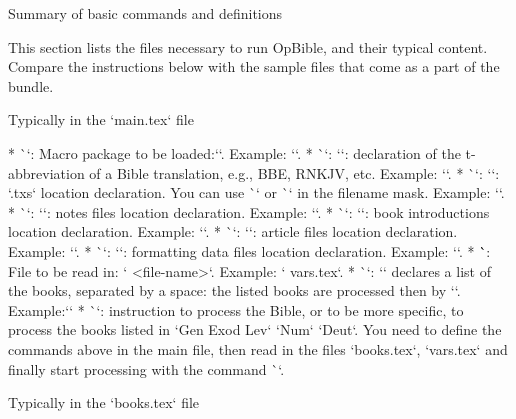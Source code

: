 {{%
\sec[sum] Summary of basic commands and definitions

This section lists the files necessary to run OpBible, and their typical content.
\recommended
Compare the instructions below with the sample files that come as a part of the bundle. 



\secc Typically in the `main.tex` file

\begitems
* \`\load`: Macro package to be loaded:``. Example: `\load [opbible]`.
* \`\tmark`: `\def\tmark{<t-abbreviation>}`: declaration of the t-abbreviation of a Bible 
translation, e.g., BBE, RNKJV, etc. 
   Example: `\def\tmark{BBE}`.
* \`\txsfile`: `\def\txsfile {<filename mask>}`: `.txs` location declaration. 
    You can use \`\amark` or \`\bmark` in the filename mask. 
    Example: `\def\txsfile {./txs/\tmark-\bmark.txs}`.
* \`\notesfile`: `\def\notesfile {<filename mask>}`:  notes files location declaration. Example: 
`\def\notesfile {./notes/notes-\amark.tex}`.
* \`\introfile`: `\def\introfile {<filename mask>}`:  book introductions location declaration. 
Example: `\def\introfile {./intros/intro-\amark.tex}`.
* \`\articlefile`: `\def\articlefile {<filename mask>}`: article files location declaration. 
   Example: `\def\articlefile {./articles/articles-\amark.tex}`.
* \`\fmtfile`: `\def\fmtfile {<filename mask>}`:  formatting data files location declaration. 
Example: `\def\fmtfile {./fmt/fmt-\tmark-\amark.tex}`.
* \``: File to be read in: ` {<file-name>}`. Example: ` {vars.tex}`.
* \`\printedbooks`: `\def\printedbooks {<list of a-marks>}` declares a list of the books, separated by a space:
    the listed books are processed then by `\processbooks`. Example:\nl `\def\printedbooks {Gen Exod Lev` 
    `Num` `Deut}`
* \`\processbooks`: instruction to process the Bible, or to be more  specific, to process the books 
listed in `\printedbooks`.
\enditems
You need to define the commands above in the main file, then
read in the files `books.tex`, `vars.tex` and finally start processing with the command
\`\processbooks`.

\secc Typically in the `books.tex` file

}}
